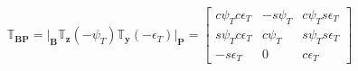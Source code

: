 

\begin{equation} \label{eq:BPtrans}
\mathbb{T}_{\mathbf{BP}}=\Bigg|_{\mathbf{B}}\mathbb{T}_{\mathbf{z}}\left(-\psi_{T}\right)\mathbb{T}_{\mathbf{y}}\left(-\epsilon_{T}\right)\Bigg|_{\mathbf{P}}=
\begin{bmatrix}
c\psi_{T}c\epsilon_{T} & -s\psi_{T} & c\psi_{T}s\epsilon_{T}\\
s\psi_{T}c\epsilon_{T} & c\psi_{T} & s\psi_{T}s\epsilon_{T}\\
-s\epsilon_{T} & 0 & c\epsilon_{T}
\end{bmatrix}
\end{equation}




